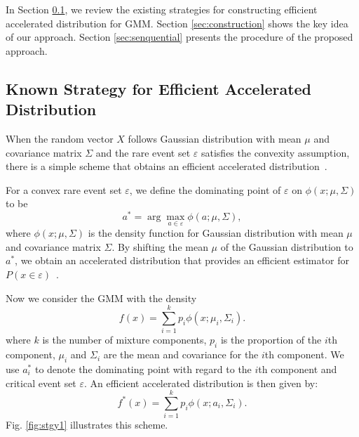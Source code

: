 \documentclass[letterpaper, 10 pt, journal]{IEEEtran}  %
\newcommand{\mansur}[1]{\textcolor{blue}{[Mansur: #1]}}
\begin{document}
In Section \ref{sec:dominant_point}, we review the existing strategies for constructing efficient accelerated distribution for GMM. Section \ref{sec:construction} shows the key idea of our approach. Section \ref{sec:senquential} presents the procedure of the proposed approach.


\subsection{Known Strategy for Efficient Accelerated Distribution}\label{sec:dominant_point}
When the random vector $X$ follows Gaussian distribution with mean $\mu$ and covariance matrix $\Sigma$ and the rare event set $\varepsilon$ satisfies the convexity assumption, there is a simple scheme that obtains an efficient accelerated distribution~\cite{sadowsky1996monte,sadowsky1990large}.

For a convex rare event set $\varepsilon$, we define the dominating point of $\varepsilon$ on $\phi(x;\mu,\Sigma)$ to be \begin{equation}\label{eq:dom}
	a^*=\arg \max_{a\in \varepsilon} \phi(a;\mu,\Sigma),
\end{equation}
where $\phi(x;\mu,\Sigma)$ is the density function for Gaussian distribution with mean $\mu$ and covariance matrix $\Sigma$. By shifting the mean $\mu$ of the Gaussian distribution to $a^*$, we obtain an accelerated distribution that provides an efficient estimator for $P(x \in \varepsilon)$~\cite{sadowsky1990large}.

Now we consider the GMM with the density \begin{equation}
	f(x)=\sum_{i=1}^{k}p_i \phi(x;\mu_i,\Sigma_i).
	\label{eq:gmm_density}
\end{equation}
where $k$ is the number of mixture components, $p_i$ is the proportion of the $i$th component, $\mu_i$ and $\Sigma_i$ are the mean and covariance for the $i$th component. We use $a^*_i$ to denote the dominating point with regard to the $i$th component and critical event set $\varepsilon$. An efficient accelerated distribution is then given by:\begin{equation}\label{eq:gmm_acc}
	f^*(x)=\sum_{i=1}^{k} p_i \phi(x;a_{i},\Sigma_i).
\end{equation}
Fig. \ref{fig:stgy1} illustrates this scheme.
\end{document}
